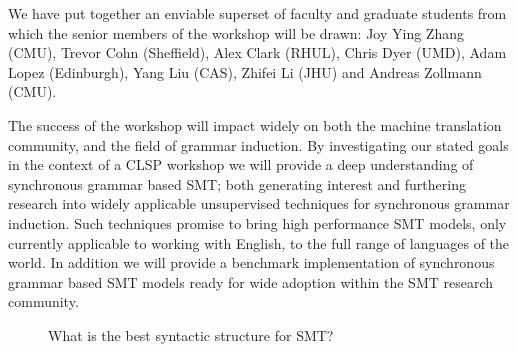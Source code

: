 \documentclass[11pt]{article}
\begin{document}
We have put together an enviable superset of faculty and graduate students from which the senior members of the workshop will be drawn: Joy Ying Zhang (CMU), Trevor Cohn (Sheffield), Alex Clark (RHUL), Chris Dyer (UMD), Adam Lopez (Edinburgh), Yang Liu (CAS), Zhifei Li (JHU) and Andreas Zollmann (CMU). 

The success of the workshop will impact widely on both the machine translation community, and the field of grammar induction.
By investigating our stated goals in the context of a CLSP workshop we will provide a deep understanding of synchronous grammar based SMT; both generating interest and furthering research into widely applicable unsupervised techniques for synchronous grammar induction. 
Such techniques promise to bring high performance SMT models, only currently applicable to working with English, to the full range of languages of the world.
In addition we will provide a benchmark implementation of synchronous grammar based SMT models ready for wide adoption within the SMT research community.

\begin{figure}
\caption{What is the best syntactic structure for SMT?}
\label{fig:models}
\end{figure}
\end{document}
